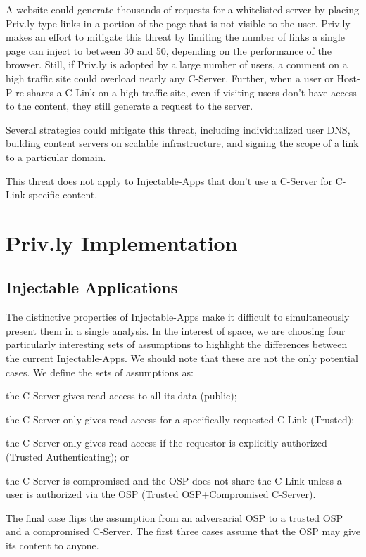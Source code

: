 \documentclass[letterpaper,twocolumn,10pt]{article}
\begin{document}
A website could generate thousands of requests for a whitelisted server by placing 
Priv.ly-type links in a portion of the page that is not visible to the user. Priv.ly 
makes an effort to mitigate this threat by limiting the number of links a single 
page can inject to between 30 and 50, depending on the performance of the browser. 
Still, if Priv.ly is adopted by a large number of users, a comment on a high 
traffic site could overload nearly any C-Server. Further, when a user or Host-P 
re-shares a C-Link on a high-traffic site, even if visiting users don't have 
access to the content, they still generate a request to the server.

Several strategies could mitigate this threat, including individualized user DNS, 
building content servers on scalable infrastructure, and signing the scope of a 
link to a particular domain.

This threat does not apply to Injectable-Apps that don't use a C-Server for
C-Link specific content.

\section{Priv.ly Implementation} \label{sec:privly_implementation}

\subsection{Injectable Applications} \label{sec:injectable_apps}

The distinctive properties of Injectable-Apps make it difficult to simultaneously present them in a single analysis.
In the interest of space, we are choosing four particularly interesting sets of assumptions to highlight the differences between the current Injectable-Apps. 
We should note that these are not the only potential cases. We define the sets of assumptions as:
\begin{inparaenum}
\item the C-Server gives read-access to all its data (public);
\item the C-Server only gives read-access for a specifically requested C-Link (Trusted);
\item the C-Server only gives read-access if the requestor is explicitly authorized (Trusted Authenticating); or
\item the C-Server is compromised and the OSP does not share the C-Link unless a user is authorized via the OSP (Trusted OSP+Compromised C-Server).
\end{inparaenum} The final case flips the assumption from an adversarial OSP to a trusted OSP and a compromised C-Server. The first three
cases assume that the OSP may give its content to anyone.
\end{document}

